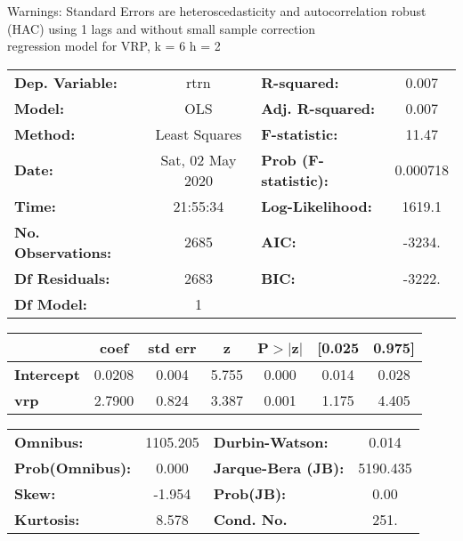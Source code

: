 Warnings: \newline
 [1] Standard Errors are heteroscedasticity and autocorrelation robust (HAC) using 1 lags and without small sample correction\\ 

regression model for VRP, k = 6 h = 2\begin{center}
\begin{tabular}{lclc}
\toprule
\textbf{Dep. Variable:}    &       rtrn       & \textbf{  R-squared:         } &     0.007   \\
\textbf{Model:}            &       OLS        & \textbf{  Adj. R-squared:    } &     0.007   \\
\textbf{Method:}           &  Least Squares   & \textbf{  F-statistic:       } &     11.47   \\
\textbf{Date:}             & Sat, 02 May 2020 & \textbf{  Prob (F-statistic):} &  0.000718   \\
\textbf{Time:}             &     21:55:34     & \textbf{  Log-Likelihood:    } &    1619.1   \\
\textbf{No. Observations:} &        2685      & \textbf{  AIC:               } &    -3234.   \\
\textbf{Df Residuals:}     &        2683      & \textbf{  BIC:               } &    -3222.   \\
\textbf{Df Model:}         &           1      & \textbf{                     } &             \\
\bottomrule
\end{tabular}
\begin{tabular}{lcccccc}
                   & \textbf{coef} & \textbf{std err} & \textbf{z} & \textbf{P$> |$z$|$} & \textbf{[0.025} & \textbf{0.975]}  \\
\midrule
\textbf{Intercept} &       0.0208  &        0.004     &     5.755  &         0.000        &        0.014    &        0.028     \\
\textbf{vrp}       &       2.7900  &        0.824     &     3.387  &         0.001        &        1.175    &        4.405     \\
\bottomrule
\end{tabular}
\begin{tabular}{lclc}
\textbf{Omnibus:}       & 1105.205 & \textbf{  Durbin-Watson:     } &    0.014  \\
\textbf{Prob(Omnibus):} &   0.000  & \textbf{  Jarque-Bera (JB):  } & 5190.435  \\
\textbf{Skew:}          &  -1.954  & \textbf{  Prob(JB):          } &     0.00  \\
\textbf{Kurtosis:}      &   8.578  & \textbf{  Cond. No.          } &     251.  \\
\bottomrule
\end{tabular}
\end{center}

